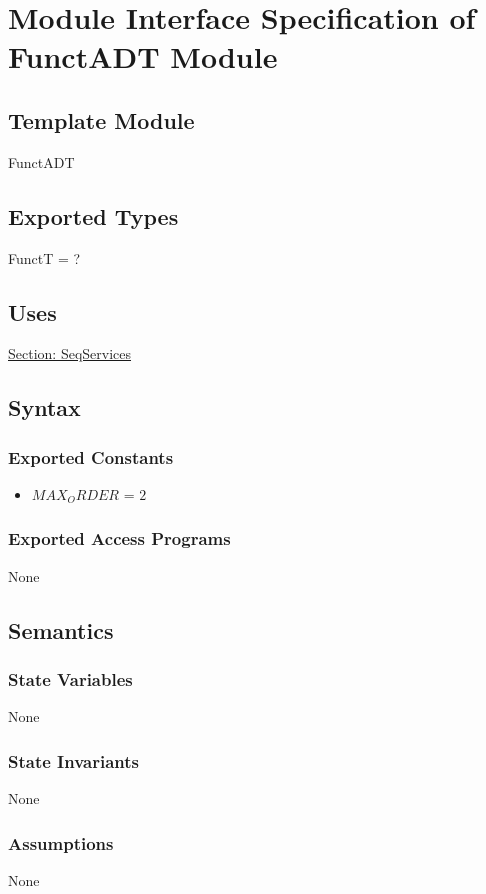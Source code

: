 \documentclass[12pt]{article}
\begin{document}
\section{Module Interface Specification of FunctADT Module}
\label{Sec:FunctADT}
\subsection{Template Module}
\label{Sec:TemplateModule}
FunctADT
\subsection{Exported Types}
\label{Sec:ExpTypes}
FunctT = ?
\subsection{Uses}
\label{Sec:Uses}
\hyperref[Sec:SeqServicesADT]{Section: SeqServices}
\subsection{Syntax}
\label{Sec:Syntax}
\subsubsection{Exported Constants}
\label{Sec:ExpConstants}
\begin{itemize}
\item{$MAX_ORDER$ = $2$}
\end{itemize}
\subsubsection{Exported Access Programs}
\label{Sec:ExpAccPrograms}
None
\subsection{Semantics}
\label{Sec:Semantics}
\subsubsection{State Variables}
\label{Sec:StateVars}
None
\subsubsection{State Invariants}
\label{Sec:StateInvars}
None
\subsubsection{Assumptions}
\label{Sec:Assumps}
None
\end{document}
